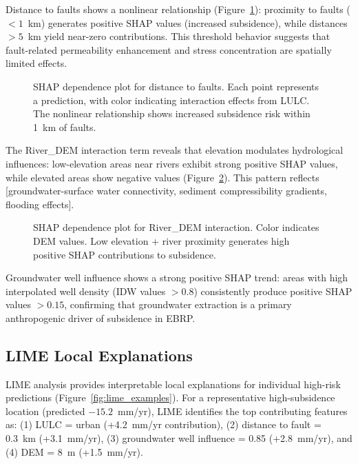 Distance to faults shows a nonlinear relationship (Figure~\ref{fig:shap_fault}): proximity to faults ($<1$~km) generates positive SHAP values (increased subsidence), while distances $>5$~km yield near-zero contributions. This threshold behavior suggests that fault-related permeability enhancement and stress concentration are spatially limited effects.

\begin{figure}[!t]
\centering
\caption{SHAP dependence plot for distance to faults. Each point represents a prediction, with color indicating interaction effects from LULC. The nonlinear relationship shows increased subsidence risk within 1~km of faults.}
\label{fig:shap_fault}
\end{figure}

The River\_DEM interaction term reveals that elevation modulates hydrological influences: low-elevation areas near rivers exhibit strong positive SHAP values, while elevated areas show negative values (Figure~\ref{fig:shap_river_dem}). This pattern reflects [groundwater-surface water connectivity, sediment compressibility gradients, flooding effects].

\begin{figure}[!t]
\centering
\caption{SHAP dependence plot for River\_DEM interaction. Color indicates DEM values. Low elevation + river proximity generates high positive SHAP contributions to subsidence.}
\label{fig:shap_river_dem}
\end{figure}

Groundwater well influence shows a strong positive SHAP trend: areas with high interpolated well density (IDW values $>0.8$) consistently produce positive SHAP values $>0.15$, confirming that groundwater extraction is a primary anthropogenic driver of subsidence in EBRP.

\subsection{LIME Local Explanations}

LIME analysis provides interpretable local explanations for individual high-risk predictions (Figure~\ref{fig:lime_examples}). For a representative high-subsidence location (predicted $-15.2$~mm/yr), LIME identifies the top contributing features as: (1) LULC = urban (+4.2~mm/yr contribution), (2) distance to fault = 0.3~km (+3.1~mm/yr), (3) groundwater well influence = 0.85 (+2.8~mm/yr), and (4) DEM = 8~m (+1.5~mm/yr).

